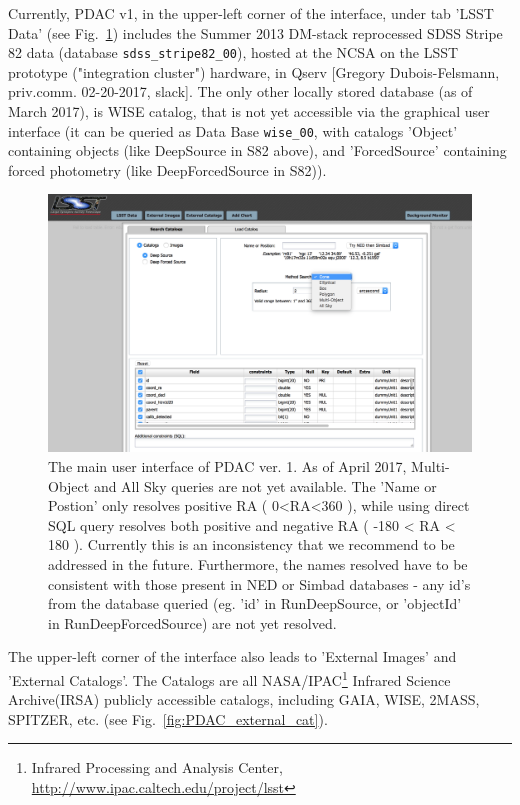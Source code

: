 \documentclass[DM,lsstdraft,toc,usenatbib]{lsstdoc}
\begin{document}
Currently, PDAC v1,  in the upper-left corner of the interface, under tab 'LSST Data' (see Fig.~\ref{fig:PDAC_interface}) includes the Summer 2013 DM-stack reprocessed SDSS Stripe 82 data (database \verb|sdss_stripe82_00|), hosted at the NCSA on the LSST prototype ("integration cluster") hardware, in Qserv [Gregory Dubois-Felsmann, priv.comm. 02-20-2017, slack].  The only other locally stored database (as of March 2017), is  WISE catalog, that is not yet accessible via the graphical user interface (it can be queried as Data Base \verb|wise_00|, with catalogs 'Object' containing objects (like DeepSource in S82 above), and 'ForcedSource' containing forced photometry (like DeepForcedSource in S82)). 




\begin{figure}
\includegraphics[width=\textwidth]{figs/1_PDAC_interface}
\caption{The main user interface of PDAC ver. 1. As of April 2017, Multi-Object and All Sky queries are not yet available. The 'Name or Postion' only resolves positive RA  (  0<RA<360 ), while using direct SQL query resolves both positive and negative RA ( -180 < RA < 180 ). Currently this is an inconsistency that we recommend to be addressed in the future. Furthermore, the names resolved have to be consistent with those present in NED or  Simbad databases - any id's from the database queried (eg. 'id' in RunDeepSource, or  'objectId' in RunDeepForcedSource) are not yet resolved.}
\label{fig:PDAC_interface}
\end{figure}


The upper-left corner of the interface also leads to 'External Images' and 'External Catalogs'. The Catalogs are all NASA/IPAC\footnote{Infrared Processing and Analysis Center, \url{http://www.ipac.caltech.edu/project/lsst}}  Infrared Science Archive(IRSA) publicly accessible catalogs, including GAIA, WISE, 2MASS, SPITZER, etc. (see Fig.~\ref{fig:PDAC_external_cat}).
\end{document}
